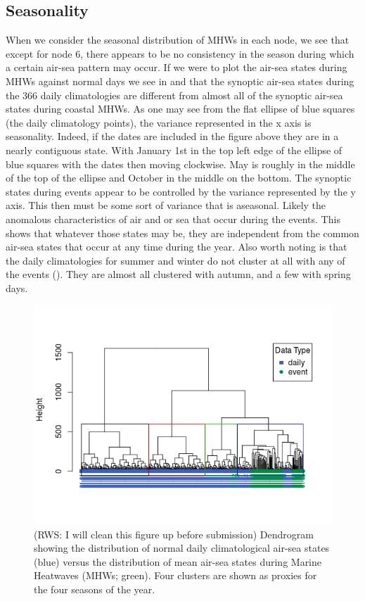 \documentclass[a4paper,10pt,review]{elsarticle}
\begin{document}
\subsection{Seasonality}
When we consider the seasonal distribution of MHWs in each node, we see that except for node 6, there appears to be no consistency in the season during which a certain air-sea pattern may occur. If we were to plot the air-sea states during MHWs against normal days we see in  and  that the synoptic air-sea states during the 366 daily climatologies are different from almost all of the synoptic air-sea states during coastal MHWs. As one may see from the flat ellipse of blue squares (the daily climatology points), the variance represented in the x axis is seasonality. Indeed, if the dates are included in the figure above they are in a nearly contiguous state. With January 1st in the top left edge of the ellipse of blue squares with the dates then moving clockwise. May is roughly in the middle of the top of the ellipse and October in the middle on the bottom. The synoptic states during events appear to be controlled by the variance represented by the y axis. This then must be some sort of variance that is aseasonal. Likely the anomalous characteristics of air and or sea that occur during the events. This shows that whatever those states may be, they are independent from the common air-sea states that occur at any time during the year. Also worth noting is that the daily climatologies for summer and winter do not cluster at all with any of the events (). They are almost all clustered with autumn, and a few with spring days.

\begin{figure}
\includegraphics[width=1.0\textwidth]{figure_6.jpeg}
\caption{(RWS: I will clean this figure up before submission) Dendrogram showing the distribution of normal daily climatological air-sea states (blue) versus the distribution of mean air-sea states during Marine Heatwaves (MHWs; green). Four clusters are shown as proxies for the four seasons of the year.}
\label{figure6}
\end{figure}
\end{document}
